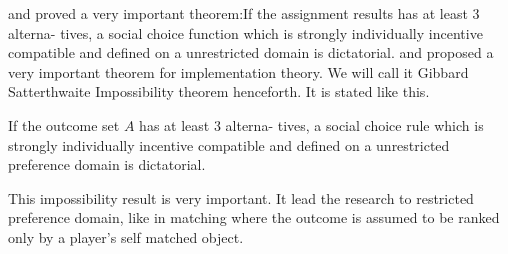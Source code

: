 \parencite{Gibbard1973 }
and \parencite{Satterthwaite1975} proved a very important theorem:If
the assignment results has at least 3 alterna-
tives, a social choice function which is strongly individually incentive compatible and
defined on a unrestricted domain is dictatorial.
\parencite{Gibbard1973} and \parencite{Satterthwaite1975} proposed a very important theorem for implementation theory. We will call it 
Gibbard Satterthwaite Impossibility theorem henceforth. It is stated like this.

\begin{thm}
If the outcome set $A$ has at least 3 alterna-
tives, a social choice rule which is strongly individually incentive compatible and
defined on a unrestricted preference domain is dictatorial.
\end{thm}

This impossibility result is very important. It lead the research to restricted preference domain, like in matching where the outcome is assumed to be ranked only by a player's self matched object. 

